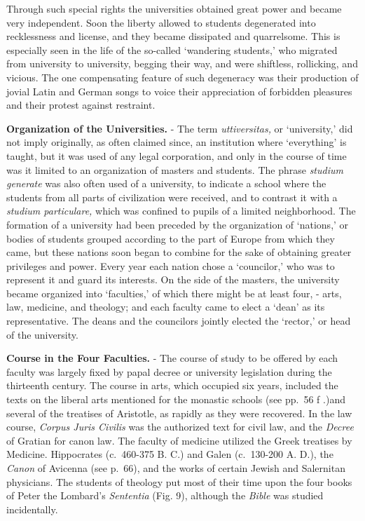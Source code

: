 \documentclass[
]{book}
\begin{document}
Through such special rights the universities obtained great power and became very independent. Soon the liberty allowed to students degenerated into recklessness and license, and they became dissipated and quarrelsome. This is especially seen in the life of the so-called `wandering students,' who migrated from university to university, begging their way, and were shiftless, rollicking, and vicious. The one compensating feature of such degeneracy was their production of jovial Latin and German songs to voice their appreciation of forbidden pleasures and their protest against restraint.

\textbf{Organization of the Universities.} - The term \emph{uttiversitas,} or `university,' did not imply originally, as often claimed since, an institution where `everything' is taught, but it was used of any legal corporation, and only in the course of time was it limited to an organization of masters and students. The phrase \emph{studium generate} was also often used of a university, to indicate a school where the students from all parts of civilization were received, and to contrast it with a \emph{studium particulare,} which was confined to pupils of a limited neighborhood. The formation of a university had been preceded by the organization of `nations,' or bodies of students grouped according to the part of Europe from which they came, but these nations soon began to combine for the sake of obtaining greater privileges and power. Every year each nation chose a `councilor,' who was to represent it and guard its interests. On the side of the masters, the university became organized into `faculties,' of which there might be at least four, - arts, law, medicine, and theology; and each faculty came to elect a `dean' as its representative. The deans and the councilors jointly elected the `rector,' or head of the university.

\textbf{Course in the Four Faculties.} - The course of study to be offered by each faculty was largely fixed by papal decree or university legislation during the thirteenth century. The course in arts, which occupied six years, included the texts on the liberal arts mentioned for the monastic schools (see pp.~56 f .)and several of the treatises of Aristotle, as rapidly as they were recovered. In the law course, \emph{Corpus Juris Civilis} was the authorized text for civil law, and the \emph{Decree} of Gratian for canon law. The faculty of medicine utilized the Greek treatises by Medicine. Hippocrates (c.~460-375 B. C.) and Galen (c.~130-200 A. D.), the \emph{Canon} of Avicenna (see p.~66), and the works of certain Jewish and Salernitan physicians. The students of theology put most of their time upon the four books of Peter the Lombard's \emph{Sententia} (Fig. 9), although the \emph{Bible} was studied incidentally.
\end{document}
